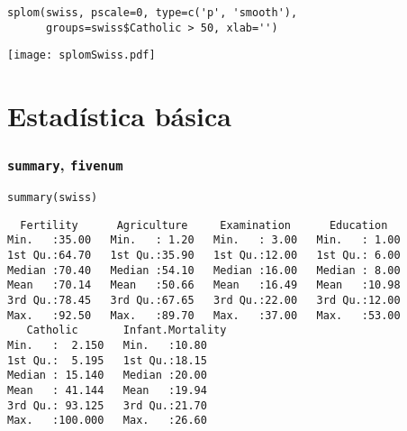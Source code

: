 \documentclass[bigger]{beamer}
\begin{document}
\begin{frame}[fragile]


\lstset{language=R}
\begin{lstlisting}
splom(swiss, pscale=0, type=c('p', 'smooth'),
      groups=swiss$Catholic > 50, xlab='')
\end{lstlisting}

\texttt{[image: splomSwiss.pdf]}
\end{frame}
\section{Estadística básica}
\label{sec-2}
\begin{frame}[fragile]
\frametitle{\texttt{summary}, \texttt{fivenum}}
\label{sec-2-1}


\lstset{language=R}
\begin{lstlisting}
summary(swiss)
\end{lstlisting}


\begin{verbatim}
  Fertility      Agriculture     Examination      Education    
Min.   :35.00   Min.   : 1.20   Min.   : 3.00   Min.   : 1.00  
1st Qu.:64.70   1st Qu.:35.90   1st Qu.:12.00   1st Qu.: 6.00  
Median :70.40   Median :54.10   Median :16.00   Median : 8.00  
Mean   :70.14   Mean   :50.66   Mean   :16.49   Mean   :10.98  
3rd Qu.:78.45   3rd Qu.:67.65   3rd Qu.:22.00   3rd Qu.:12.00  
Max.   :92.50   Max.   :89.70   Max.   :37.00   Max.   :53.00  
   Catholic       Infant.Mortality
Min.   :  2.150   Min.   :10.80   
1st Qu.:  5.195   1st Qu.:18.15   
Median : 15.140   Median :20.00   
Mean   : 41.144   Mean   :19.94   
3rd Qu.: 93.125   3rd Qu.:21.70   
Max.   :100.000   Max.   :26.60
\end{verbatim}
\end{frame}
\end{document}
